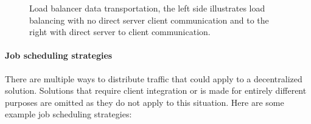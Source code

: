 \begin{figure}
	\centering
	\scalebox{0.7}{}
	\scalebox{0.7}{}
	\caption[Load balancer data transportation]{
		\label{fig:LoadbalancerOperation} 
		\footnotesize{%
			Load balancer data transportation, the left side illustrates load balancing with no direct server client communication and to the right with direct server to client communication.
		}
	}
\end{figure}


\paragraph{Job scheduling strategies} %
There are multiple ways to distribute traffic that could apply to a decentralized solution.
Solutions that require client integration or is made for entirely different purposes are omitted as they do not apply to this situation.
Here are some example job scheduling strategies:

